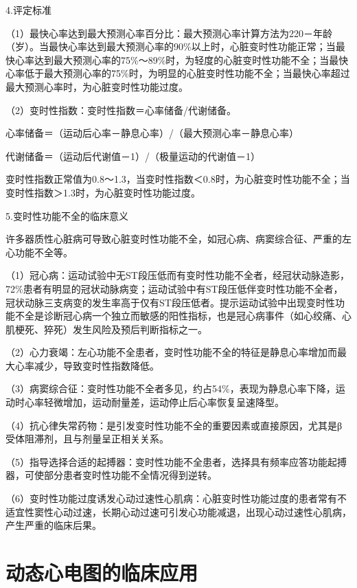 4.评定标准

（1）最快心率达到最大预测心率百分比：最大预测心率计算方法为220－年龄（岁）。当最快心率达到最大预测心率的90\%以上时，心脏变时性功能正常；当最快心率达到最大预测心率的75\%～89\%时，为轻度的心脏变时性功能不全；当最快心率低于最大预测心率的75\%时，为明显的心脏变时性功能不全；当最快心率超过最大预测心率时，为心脏变时性功能过度。

（2）变时性指数：变时性指数＝心率储备/代谢储备。

心率储备＝（运动后心率－静息心率）/（最大预测心率－静息心率）

代谢储备＝（运动后代谢值－1）/（极量运动的代谢值－1）

变时性指数正常值为0.8～1.3，当变时性指数＜0.8时，为心脏变时性功能不全；当变时性指数＞1.3时，为心脏变时性功能过度。

5.变时性功能不全的临床意义

许多器质性心脏病可导致心脏变时性功能不全，如冠心病、病窦综合征、严重的左心功能不全等。

（1）冠心病：运动试验中无ST段压低而有变时性功能不全者，经冠状动脉造影，72\%患者有明显的冠状动脉病变；运动试验中有ST段压低伴变时性功能不全者，冠状动脉三支病变的发生率高于仅有ST段压低者。提示运动试验中出现变时性功能不全是诊断冠心病一个独立而敏感的阳性指标，也是冠心病事件（如心绞痛、心肌梗死、猝死）发生风险及预后判断指标之一。

（2）心力衰竭：左心功能不全患者，变时性功能不全的特征是静息心率增加而最大心率减少，导致变时性指数降低。

（3）病窦综合征：变时性功能不全者多见，约占54\%，表现为静息心率下降，运动时心率轻微增加，运动耐量差，运动停止后心率恢复呈速降型。

（4）抗心律失常药物：是引发变时性功能不全的重要因素或直接原因，尤其是β受体阻滞剂，且与剂量呈正相关关系。

（5）指导选择合适的起搏器：变时性功能不全患者，选择具有频率应答功能起搏器，可使部分患者变时性功能不全情况得到逆转。

（6）变时性功能过度诱发心动过速性心肌病：心脏变时性功能过度的患者常有不适宜性窦性心动过速，长期心动过速可引发心功能减退，出现心动过速性心肌病，产生严重的临床后果。

\protect\hypertarget{text00056.htmlux5cux23subid670}{}{}

\section{动态心电图的临床应用}

\protect\hypertarget{text00056.htmlux5cux23subid671}{}{}

